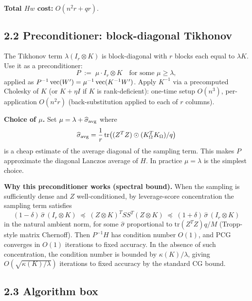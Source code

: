 \medskip
\noindent\textbf{Total $Hw$ cost:} $O(n^2 r + qr)$.

\subsection*{2.2 Preconditioner: block-diagonal Tikhonov}

The Tikhonov term $\lambda(I_r\otimes K)$ is block-diagonal with $r$ blocks each equal to $\lambda K$.  Use it as a preconditioner:
\[
P \;:=\; \mu\cdot I_r\otimes K\quad\text{for some }\mu\geq\lambda,
\]
applied as $P^{-1}\operatorname{vec}(W')=\mu^{-1}\operatorname{vec}(K^{-1}W')$.  Apply $K^{-1}$ via a precomputed Cholesky of $K$ (or $K+\eta I$ if $K$ is rank-deficient): one-time setup $O(n^3)$, per-application $O(n^2 r)$ (back-substitution applied to each of $r$ columns).

\textbf{Choice of $\mu$.}  Set $\mu=\lambda + \widehat{\sigma}_{\rm avg}$ where
\[
\widehat\sigma_{\rm avg}=\frac{1}{r}\,\mathrm{tr}\bigl((Z^TZ)\odot(K_{\Omega}^TK_{\Omega})/q\bigr)
\]
is a cheap estimate of the average diagonal of the sampling term.  This makes $P$ approximate the diagonal Lanczos average of $H$.  In practice $\mu=\lambda$ is the simplest choice.

\textbf{Why this preconditioner works (spectral bound).}  When the sampling is sufficiently dense and $Z$ well-conditioned, by leverage-score concentration the sampling term satisfies
\[
(1-\delta)\,\widehat\sigma\,(I_r\otimes K)\;\preceq\;(Z\otimes K)^T SS^T(Z\otimes K)\;\preceq\;(1+\delta)\,\widehat\sigma\,(I_r\otimes K)
\]
in the natural ambient norm, for some $\widehat\sigma$ proportional to $\mathrm{tr}(Z^TZ)q/M$ (Tropp-style matrix Chernoff).  Then $P^{-1}H$ has condition number $O(1)$, and PCG converges in $O(1)$ iterations to fixed accuracy.  In the absence of such concentration, the condition number is bounded by $\kappa(K)/\lambda$, giving $O(\sqrt{\kappa(K)/\lambda})$ iterations to fixed accuracy by the standard CG bound.

\subsection*{2.3 Algorithm box}

